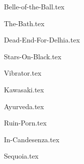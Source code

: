 \begin{songs}{}

  {Belle-of-the-Ball.tex}

  {The-Bath.tex}

  {Dead-End-For-Delhia.tex}
  \sclearpage

  {Stars-On-Black.tex}
  \sclearpage

  {Vibrator.tex}
  \sclearpage

  {Kawasaki.tex}
  \sclearpage

  {Ayurveda.tex}

  {Ruin-Porn.tex}
  \sclearpage

  {In-Candesenza.tex}
  \sclearpage

  {Sequoia.tex}
  \sclearpage

\end{songs}
